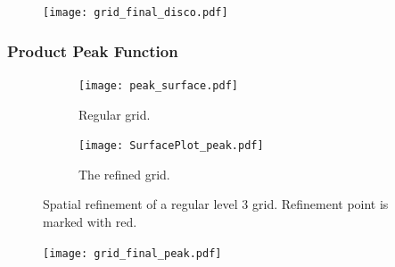 \begin{figure}[htbp]
    \centering
    \texttt{[image: grid\_final\_disco.pdf]}
    \caption{}
    \label{fig:discogrid}
\end{figure}

\subsubsection{Product Peak Function}\label{sec:productpeak}

\begin{figure}[hbtp]
    \centering
    \begin{subfigure}{0.45\textwidth}
        \texttt{[image: peak\_surface.pdf]}
        \caption{Regular grid.}
        \label{fig:regularlevel3}
    \end{subfigure}
    \begin{subfigure}{0.45\textwidth}
        \texttt{[image: SurfacePlot\_peak.pdf]}
        \caption{The refined grid.}
    \end{subfigure}
    \caption{Spatial refinement of a regular level 3 grid. Refinement point is marked with red.}
    \label{fig:peaksurface}
\end{figure}

\begin{figure}[hbtp]
    \centering
    
    \caption{}
    \label{fig:peakerr}
\end{figure}

\begin{figure}[htbp]
    \centering
    \texttt{[image: grid\_final\_peak.pdf]}
    \caption{}
    \label{fig:peakgrid}
\end{figure}